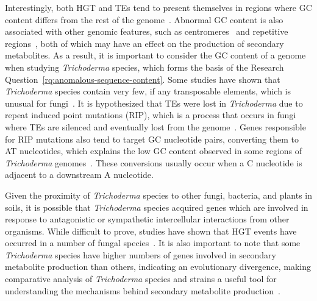 Interestingly, both HGT and TEs tend to present themselves in regions where GC content differs from the rest of the genome~\cite{goncalves2024}. Abnormal GC content is also associated with other genomic features, such as centromeres~\cite{plohl2014a} and repetitive regions~\cite{winter2018}, both of which may have an effect on the production of secondary metabolites. As a result, it is important to consider the GC content of a genome when studying \textit{Trichoderma} species, which forms the basis of the Research Question~\ref{rq:anomalous-sequence-content}. Some studies have shown that \textit{Trichoderma} species contain very few, if any transposable elements, which is unusual for fungi~\cite{kubicek2011}. It is hypothesized that TEs were lost in \textit{Trichoderma} due to repeat induced point mutations (RIP), which is a process that occurs in fungi where TEs are silenced and eventually lost from the genome~\cite{kubicek2011}. Genes responsible for RIP mutations also tend to target GC nucleotide pairs, converting them to AT nucleotides, which explains the low GC content observed in some regions of \textit{Trichoderma} genomes~\cite{goncalves2024}. These conversions usually occur when a C nucleotide is adjacent to a downstream A nucleotide.


Given the proximity of \textit{Trichoderma} species to other fungi, bacteria, and plants in soils, it is possible that \textit{Trichoderma} species acquired genes which are involved in response to antagonistic or sympathetic intercellular interactions from other organisms. While difficult to prove, studies have shown that HGT events have occurred in a number of fungal species~\cite{fitzpatrick2012}. It is also important to note that some \textit{Trichoderma} species have higher numbers of genes involved in secondary metabolite production than others, indicating an evolutionary divergence, making comparative analysis of \textit{Trichoderma} species and strains a useful tool for understanding the mechanisms behind secondary metabolite production~\cite{Mukherjee2012}.

